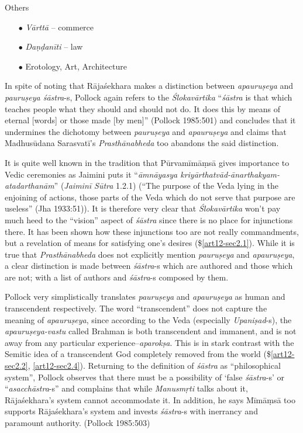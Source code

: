 Others
\begin{itemize}
\item[$\bullet$] {\sl Vārttā} -- commerce

\item[$\bullet$] {\sl Daṇḍanīti} -- law

\item[$\bullet$] Erotology, Art, Architecture
\end{itemize}

In spite of noting that Rājaśekhara makes a distinction between {\sl apauruṣeya} and {\sl pauruṣeya śāstra}-s, Pollock again refers to the {\sl Ślokavārtika} ``{\sl śāstra} is that which teaches people what they should and should not do. It does this by means of eternal [words] or those made [by men]'' (Pollock 1985:501) and concludes that it undermines the dichotomy between {\sl pauruṣeya} and {\sl apauruṣeya} and claims that Madhusūdana Sarasvatī's {\sl Prasthānabheda} too abandons the said distinction. 

It is quite well known in the tradition that Pūrvamīmāṃsā gives importance to Vedic ceremonies as Jaimini puts it ``{\sl āmnāyasya kriyārthatvād-ānarthakyam-atadarthanām}'' ({\sl Jaiminī Sūtra} 1.2.1) (``The purpose of the Veda lying in the enjoining of actions, those parts of the Veda which do not serve that purpose are useless'' (Jha 1933:51)). It is therefore very clear that {\sl Ślokavārtika} won't pay much heed to the ``vision'' aspect of {\sl śāstra} since there is no place for injunctions there. It has been shown how these injunctions too are not really commandments, but a revelation of means for satisfying one's desires (\$\ref{art12-sec2.1}). While it is true that {\sl Prasthānabheda} does not explicitly mention {\sl pauruṣeya} and {\sl apauruṣeya}, a clear distinction is made between {\sl śāstra}-s which are authored and those which are not; with a list of authors and {\sl śāstra}-s composed by them. 

Pollock very simplistically translates {\sl pauruṣeya} and {\sl apauruṣeya} as human and transcendent respectively. The word ``transcendent'' does not capture the meaning of {\sl apauruṣeya}, since according to the Veda (especially {\sl Upaniṣad}-s), the {\sl apauruṣeya-vastu} called Brahman is both transcendent and immanent, and is not away from any particular experience--{\sl aparokṣa}. This is in stark contrast with the Semitic idea of a transcendent God completely removed from the world (\$\ref{art12-sec2.2}, \ref{art12-sec2.4}). Returning to the deﬁnition of {\sl śāstra} as ``philosophical system'', Pollock observes that there must be a possibility of `false {\sl śāstra}-s' or ``{\sl asacchāstra}-s'' and complains that while {\sl Manusmṛti} talks about it, Rājaśekhara's system cannot accommodate it. In addition, he says Mīmāṃsā too supports Rājaśekhara's system and invests {\sl śāstra}-s with inerrancy and paramount authority. (Pollock 1985:503)

